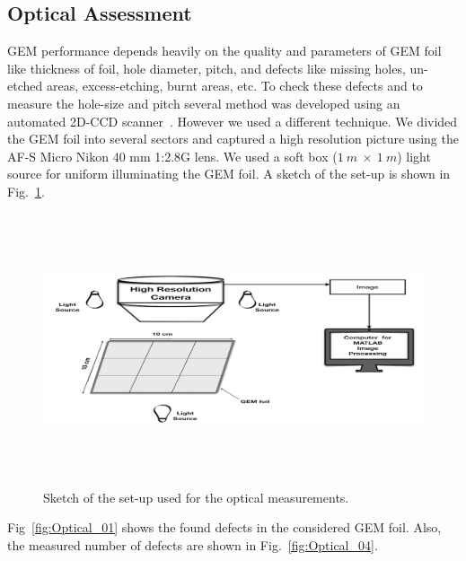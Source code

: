 \subsection{Optical Assessment}
GEM performance depends heavily on the quality and parameters of GEM foil like thickness of foil, hole diameter, pitch, and defects like missing holes, un-etched areas, excess-etching, burnt areas, etc. To check these defects and to measure the hole-size and pitch several method was developed using an automated 2D-CCD scanner~\cite{Posik2015, Becker2006}. However we used a different technique. We divided the GEM foil into several sectors and captured a high resolution picture using the AF-S Micro Nikon 40 mm 1:2.8G lens. We used a soft box ($1~m~\times~1~m$) light source for uniform illuminating the GEM foil.
A sketch of the set-up is shown in Fig.~\ref{fig:Optical_Sketch}.
\begin{figure}[!htbp]
    \centering
        \includegraphics[width=12cm, height=8cm]{figures/GEM/figures/2.jpeg}
   \caption{Sketch of the set-up used for the optical measurements.}   \label{fig:Optical_Sketch}
\end{figure}
Fig~\ref{fig:Optical_01} shows the found defects in the considered GEM foil. Also, the measured number of defects are shown in Fig.~\ref{fig:Optical_04}.
